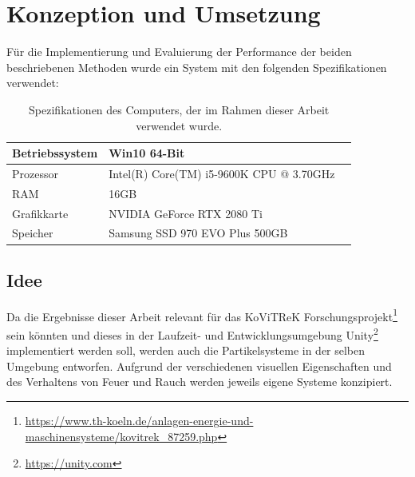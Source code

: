 \section{Konzeption und Umsetzung}
\label{sec:4}

Für die Implementierung und Evaluierung der Performance der beiden beschriebenen Methoden wurde ein System mit den folgenden Spezifikationen verwendet:

\begin{table}[h!]
	\renewcommand*{\arraystretch}{2}
	\setlength{\tabcolsep}{1.5cm}
	\begin{tabular}{lll}
		\hspace{-1.5cm}Betriebssystem & Win10 64-Bit                             \\ \hline
		\hspace{-1.5cm}Prozessor      & Intel(R) Core(TM) i5-9600K CPU @ 3.70GHz \\ \hline
		\hspace{-1.5cm}RAM            & 16GB                                     \\ \hline
		\hspace{-1.5cm}Grafikkarte    & NVIDIA GeForce RTX 2080 Ti               \\ \hline
		\hspace{-1.5cm}Speicher       & Samsung SSD 970 EVO Plus 500GB           \\ \hline
	\end{tabular}
	\caption{Spezifikationen des Computers, der im Rahmen dieser Arbeit verwendet wurde.}
\end{table}

\subsection{Idee}
\label{sec:4.1}

Da die Ergebnisse dieser Arbeit relevant für das KoViTReK Forschungsprojekt\footnote{\url{https://www.th-koeln.de/anlagen-energie-und-maschinensysteme/kovitrek\_87259.php}}
sein könnten und dieses in der Laufzeit- und Entwicklungsumgebung Unity\footnote{\url{https://unity.com}}
implementiert werden soll, werden auch die Partikelsysteme in der selben Umgebung entworfen.
Aufgrund der verschiedenen visuellen Eigenschaften und des Verhaltens von Feuer und Rauch werden jeweils eigene Systeme konzipiert.

